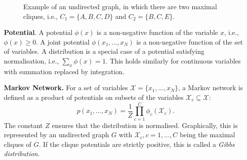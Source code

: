 \documentclass{article}
\begin{document}
\begin{figure}[H]
    \centering
    \caption{Example of an undirected graph, in which there are two maximal cliques, i.e., $C_1 = \{A, B, C, D\}$ and $C_2 = \{B, C, E\}$.}
    \label{fig:clique}
\end{figure}

\begin{theorem}
    \textbf{Potential}. A potential $\phi(x)$ is a non-negative function of the variable $x$, i.e., $\phi(x) \geq 0$. A joint potential $\phi(x_1, \dots, x_N)$ is a non-negative function of the set of variables. A distribution is a special case of a potential satisfying normalisation, i.e., $\sum_x \phi(x) = 1$. This holds similarly for continuous variables with summation replaced by integration. 
\end{theorem}

\begin{theorem}
    \textbf{Markov Network.} For a set of variables $\mathcal{X} = \{x_1, \dots, x_N\}$, a Markov network is defined as a product of potentials on subsets of the variables $\mathcal{X}_c \subseteq \mathcal{X}$:
    $$
        p(x_1, \dots, x_N) = \frac{1}{Z} \prod_{c=1}^C \phi_c (\mathcal{X}_c) .
    $$
    The constant $Z$ ensures that the distribution is normalised. Graphically, this is represented by an undirected graph $G$ with $\mathcal{X}_c, c = 1, \dots, C$ being the maximal cliques of $G$. If the clique potentials are strictly positive, this is called a \textit{Gibbs distribution}. 
\end{theorem}
\end{document}
